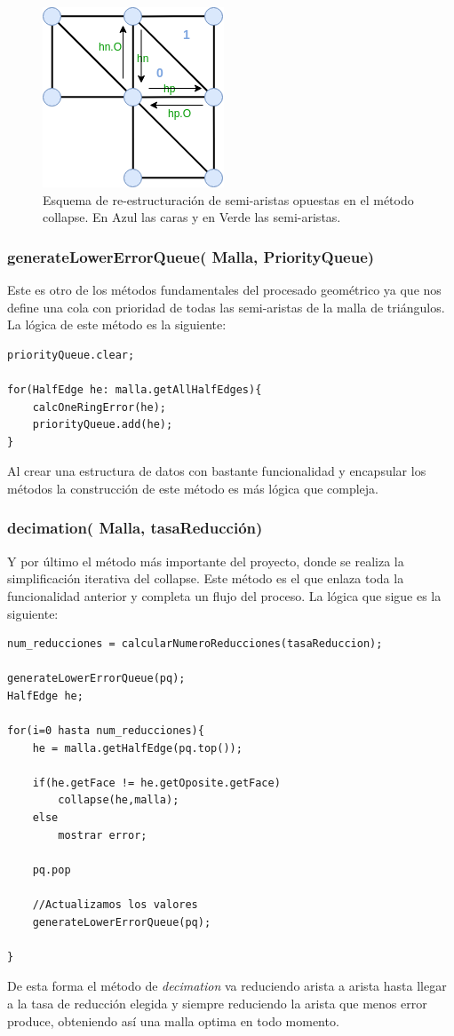 \begin{figure} %
	\centering
	\includegraphics[scale=0.8]{imagenes/collapse_011.png} 
	\caption{Esquema de re-estructuración de semi-aristas opuestas en el método collapse. En Azul las caras y en Verde las semi-aristas.} \label{fig:collapse_011.png}
\end{figure}

\newpage
\subsubsection*{generateLowerErrorQueue( Malla, PriorityQueue)}

Este es otro de los métodos fundamentales del procesado geométrico ya que nos define una cola con prioridad de todas las semi-aristas de la malla de triángulos. La lógica de este método es la siguiente:

\begin{lstlisting}[frame=single]
priorityQueue.clear;

for(HalfEdge he: malla.getAllHalfEdges){
	calcOneRingError(he);
	priorityQueue.add(he);
}

\end{lstlisting}

Al crear una estructura de datos con bastante funcionalidad y encapsular los métodos la construcción de este método es más lógica que compleja.

\subsubsection*{decimation( Malla, tasaReducción)}
Y por último el método más importante del proyecto, donde se realiza la simplificación iterativa del collapse. Este método es el que enlaza toda la funcionalidad anterior y completa un flujo del proceso.
La lógica que sigue es la siguiente:

\begin{lstlisting}[frame=single]
num_reducciones = calcularNumeroReducciones(tasaReduccion);

generateLowerErrorQueue(pq);
HalfEdge he;

for(i=0 hasta num_reducciones){
	he = malla.getHalfEdge(pq.top());
	
	if(he.getFace != he.getOposite.getFace)
		collapse(he,malla);
	else
		mostrar error;
	
	pq.pop
	
	//Actualizamos los valores
	generateLowerErrorQueue(pq);
	
}
\end{lstlisting}

De esta forma el método de \textit{decimation} va reduciendo arista a arista hasta llegar a la tasa de reducción elegida y siempre reduciendo la arista que menos error produce, obteniendo así una malla optima en todo momento.